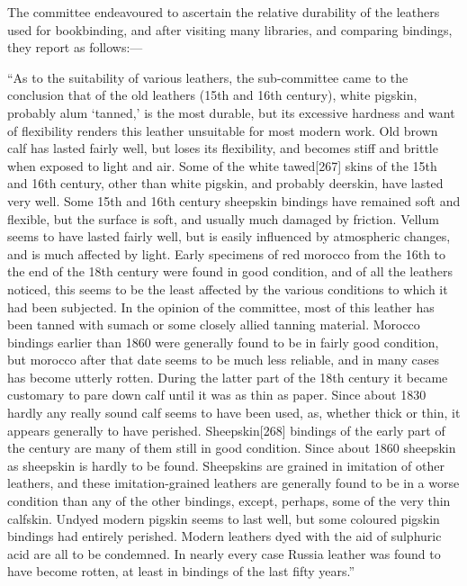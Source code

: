 \documentclass[
]{article}
\begin{document}
The committee endeavoured to ascertain the relative durability of the
leathers used for bookbinding, and after visiting many libraries, and
comparing bindings, they report as follows:---

``As to the suitability of various leathers, the sub-committee came to
the conclusion that of the old leathers (15th and 16th century), white
pigskin, probably alum `tanned,' is the most durable, but its excessive
hardness and want of flexibility renders this leather unsuitable for
most modern work. Old brown calf has lasted fairly well, but loses its
flexibility, and becomes stiff and brittle when exposed to light and
air. Some of the white
tawed{\protect\hypertarget{Page_267}{}{{[}267{]}}} skins of the 15th and
16th century, other than white pigskin, and probably deerskin, have
lasted very well. Some 15th and 16th century sheepskin bindings have
remained soft and flexible, but the surface is soft, and usually much
damaged by friction. Vellum seems to have lasted fairly well, but is
easily influenced by atmospheric changes, and is much affected by light.
Early specimens of red morocco from the 16th to the end of the 18th
century were found in good condition, and of all the leathers noticed,
this seems to be the least affected by the various conditions to which
it had been subjected. In the opinion of the committee, most of this
leather has been tanned with sumach or some closely allied tanning
material. Morocco bindings earlier than 1860 were generally found to be
in fairly good condition, but morocco after that date seems to be much
less reliable, and in many cases has become utterly rotten. During the
latter part of the 18th century it became customary to pare down calf
until it was as thin as paper. Since about 1830 hardly any really sound
calf seems to have been used, as, whether thick or thin, it appears
generally to have perished.
Sheepskin{\protect\hypertarget{Page_268}{}{{[}268{]}}} bindings of the
early part of the century are many of them still in good condition.
Since about 1860 sheepskin as sheepskin is hardly to be found.
Sheepskins are grained in imitation of other leathers, and these
imitation-grained leathers are generally found to be in a worse
condition than any of the other bindings, except, perhaps, some of the
very thin calfskin. Undyed modern pigskin seems to last well, but some
coloured pigskin bindings had entirely perished. Modern leathers dyed
with the aid of sulphuric acid are all to be condemned. In nearly every
case Russia leather was found to have become rotten, at least in
bindings of the last fifty years.''
\end{document}
